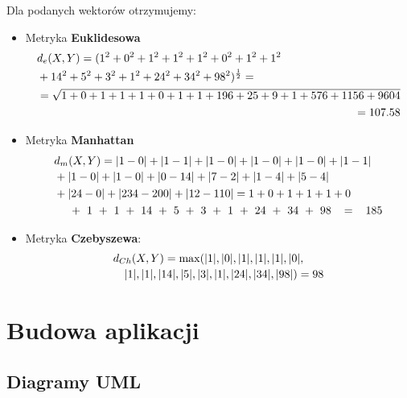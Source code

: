 \documentclass{classrep}
\begin{document}
Dla podanych wektorów otrzymujemy:\\
\begin{itemize}
    \item Metryka \textbf{Euklidesowa}
    \begin{equation}\label{euklidesExample}
    \begin{multlined}
        d_e(X,Y) = (1^2+0^2+1^2+1^2+1^2+0^2+1^2+1^2\\
        \shoveleft +14^2+5^2+3^2+1^2+24^2+34^2+98^2)^\frac{1}{2}=\\
        \shoveleft = \sqrt{1+0+1+1+1+0+1+1+196+25+9+1+576+1156+9604}\\= 107.58
    \end{multlined}
    \end{equation}
    \item Metryka \textbf{Manhattan}
    \begin{equation}\label{taxiExample}
    \begin{multlined}
        d_m(X,Y) = |1-0|+|1-1|+|1-0|+|1-0|+|1-0|+|1-1|\\
        \shoveleft +|1-0|+|1-0|+|0-14|+|7-2|+|1-4|+|5-4|\\
        \shoveleft +|24-0|+|234-200|+|12-110| = 1+0+1+1+1+0\\
        \shoveleft +1+1+14+5+3+1+24+34+98 = 185
    \end{multlined}
    \end{equation}
    \item Metryka \textbf{Czebyszewa}:
    \begin{equation}\label{czebyszewExample}
    \begin{multlined}
        d_{Ch}(X,Y) = \max(|1|, |0|, |1|, |1|, |1|,|0|,\\
        \shoveleft |1|, |1|, |14|, |5|, |3|, |1|, |24|, |34|, |98|) = 98
    \end{multlined}
    \end{equation}
\end{itemize}


\section{Budowa aplikacji}
\subsection{Diagramy UML}
\end{document}

